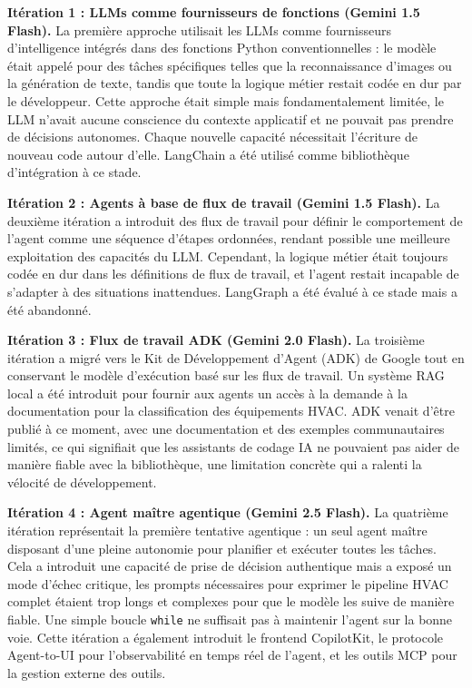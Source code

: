 \textbf{Itération 1 : LLMs comme fournisseurs de fonctions (Gemini 1.5 Flash).}
La première approche utilisait les LLMs comme fournisseurs d'intelligence intégrés dans des fonctions
Python conventionnelles : le modèle était appelé pour des tâches spécifiques telles que la reconnaissance
d'images ou la génération de texte, tandis que toute la logique métier restait codée en dur par le
développeur.
Cette approche était simple mais fondamentalement limitée, le LLM n'avait aucune conscience du contexte
applicatif et ne pouvait pas prendre de décisions autonomes. Chaque nouvelle capacité nécessitait
l'écriture de nouveau code autour d'elle. LangChain a été utilisé comme bibliothèque d'intégration à
ce stade.

\textbf{Itération 2 : Agents à base de flux de travail (Gemini 1.5 Flash).}
La deuxième itération a introduit des flux de travail pour définir le comportement de l'agent comme une
séquence d'étapes ordonnées, rendant possible une meilleure exploitation des capacités du LLM. Cependant,
la logique métier était toujours codée en dur dans les définitions de flux de travail, et l'agent restait
incapable de s'adapter à des situations inattendues. LangGraph a été évalué à ce stade mais a été
abandonné.

\textbf{Itération 3 : Flux de travail ADK (Gemini 2.0 Flash).}
La troisième itération a migré vers le Kit de Développement d'Agent (ADK) de Google tout en conservant
le modèle d'exécution basé sur les flux de travail. Un système RAG local a été introduit pour fournir aux
agents un accès à la demande à la documentation pour la classification des équipements HVAC. ADK venait
d'être publié à ce moment, avec une documentation et des exemples communautaires limités, ce qui signifiait
que les assistants de codage IA ne pouvaient pas aider de manière fiable avec la bibliothèque, une
limitation concrète qui a ralenti la vélocité de développement.

\textbf{Itération 4 : Agent maître agentique (Gemini 2.5 Flash).}
La quatrième itération représentait la première tentative agentique : un seul agent maître disposant d'une
pleine autonomie pour planifier et exécuter toutes les tâches. Cela a introduit une capacité de prise de
décision authentique mais a exposé un mode d'échec critique, les prompts nécessaires pour exprimer
le pipeline HVAC complet étaient trop longs et complexes pour que le modèle les suive de manière fiable.
Une simple boucle \texttt{while} ne suffisait pas à maintenir l'agent sur la bonne voie. Cette itération
a également introduit le frontend CopilotKit, le protocole Agent-to-UI pour l'observabilité en temps réel
de l'agent, et les outils MCP pour la gestion externe des outils.

